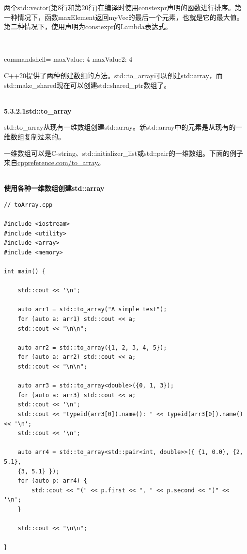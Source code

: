 两个std::vector(第8行和第20行)在编译时使用constexpr声明的函数进行排序。第一种情况下，函数maxElement返回myVec的最后一个元素，也就是它的最大值。第二种情况下，使用声明为constexpr的Lambda表达式。

\hspace*{\fill} \\ %
\begin{tcblisting}{commandshell={}}
maxValue: 4
maxValue2: 4
\end{tcblisting}


C++20提供了两种创建数组的方法。std::to\_array可以创建std::array，而std::make\_shared现在可以创建std::shared\_ptr数组了。

\hspace*{\fill} \\ %
\noindent
\textbf{5.3.2.1\hspace{0.2cm}std::to\_array}

std::to\_array从现有一维数组创建std::array。新std::array中的元素是从现有的一维数组复制过来的。

一维数组可以是C-string、std::initializer\_list或std::pair的一维数组。下面的例子来自\href{https://en.cppreference.com/w/cpp/container/array/to_array}{cppreference.com/to\_array}。

\hspace*{\fill} \\ %
\noindent
\textbf{使用各种一维数组创建std::array}
\begin{lstlisting}[style=styleCXX]
// toArray.cpp

#include <iostream>
#include <utility>
#include <array>
#include <memory>

int main() {

	std::cout << '\n';
	
	auto arr1 = std::to_array("A simple test");
	for (auto a: arr1) std::cout << a;
	std::cout << "\n\n";
	
	auto arr2 = std::to_array({1, 2, 3, 4, 5});
	for (auto a: arr2) std::cout << a;
	std::cout << "\n\n";
	
	auto arr3 = std::to_array<double>({0, 1, 3});
	for (auto a: arr3) std::cout << a;
	std::cout << '\n';
	std::cout << "typeid(arr3[0]).name(): " << typeid(arr3[0]).name() << '\n';
	std::cout << '\n';
	
	auto arr4 = std::to_array<std::pair<int, double>>({ {1, 0.0}, {2, 5.1},
	{3, 5.1} });
	for (auto p: arr4) {
		std::cout << "(" << p.first << ", " << p.second << ")" << '\n';
	}
	
	std::cout << "\n\n";

}
\end{lstlisting}


